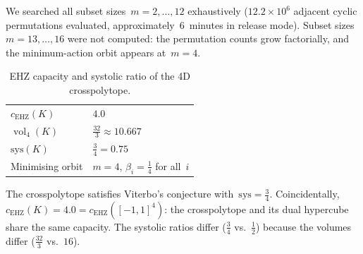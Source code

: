 We searched all subset sizes~$m = 2, \ldots, 12$ exhaustively
($12.2 \times 10^6$ adjacent cyclic permutations evaluated,
approximately~$6$~minutes in release mode).
Subset sizes~$m = 13, \ldots, 16$ were not computed: the permutation
counts grow factorially, and the minimum-action orbit appears at~$m = 4$.

\begin{table}[h]
\centering
\begin{tabular}{ll}
\toprule
$c_{\mathrm{EHZ}}(K)$ & $4.0$ \\
$\operatorname{vol}_4(K)$ & $\tfrac{32}{3} \approx 10.667$ \\
$\mathrm{sys}(K)$ & $\tfrac{3}{4} = 0.75$ \\
Minimising orbit & $m = 4$, $\beta_i = \tfrac{1}{4}$ for all~$i$ \\
\bottomrule
\end{tabular}
\caption{EHZ capacity and systolic ratio of the 4D crosspolytope.}
\label{tab:crosspolytope}
\end{table}

The crosspolytope satisfies Viterbo's conjecture with~$\mathrm{sys} =
\tfrac{3}{4}$.
Coincidentally, $c_{\mathrm{EHZ}}(K) = 4.0 = c_{\mathrm{EHZ}}([-1,1]^4)$:
the crosspolytope and its dual hypercube share the same capacity.
The systolic ratios differ ($\tfrac{3}{4}$ vs.\ $\tfrac{1}{2}$) because
the volumes differ ($\tfrac{32}{3}$ vs.\ $16$).
